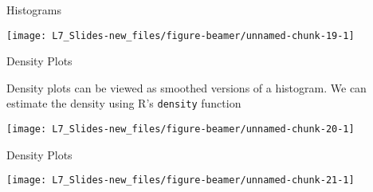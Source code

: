 \documentclass[ignorenonframetext,]{beamer}
\newenvironment{Shaded}{\begin{snugshade}}{\end{snugshade}}
\newcommand{\KeywordTok}[1]{\textcolor[rgb]{0.13,0.29,0.53}{\textbf{{#1}}}}
\newcommand{\DataTypeTok}[1]{\textcolor[rgb]{0.13,0.29,0.53}{{#1}}}
\newcommand{\StringTok}[1]{\textcolor[rgb]{0.31,0.60,0.02}{{#1}}}
\newcommand{\NormalTok}[1]{{#1}}
\begin{document}
\begin{frame}{Histograms}

\small

\begin{center}\texttt{[image: L7\_Slides-new\_files/figure-beamer/unnamed-chunk-19-1]} \end{center}

\end{frame}

\begin{frame}[fragile]{Density Plots}

Density plots can be viewed as smoothed versions of a histogram. We can
estimate the density using R's \texttt{density} function

\small

\begin{Shaded}
\end{Shaded}

\begin{center}\texttt{[image: L7\_Slides-new\_files/figure-beamer/unnamed-chunk-20-1]} \end{center}

\end{frame}

\begin{frame}[fragile]{Density Plots}

\small

\begin{Shaded}
\end{Shaded}

\begin{center}\texttt{[image: L7\_Slides-new\_files/figure-beamer/unnamed-chunk-21-1]} \end{center}

\end{frame}
\end{document}

